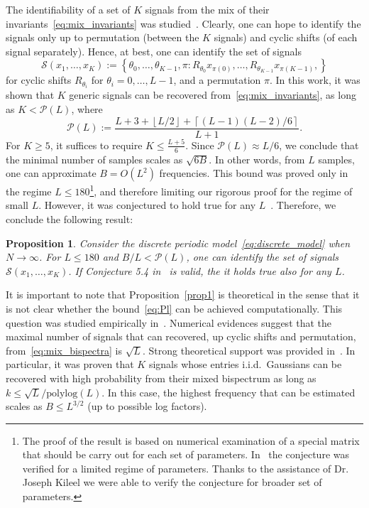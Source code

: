 \documentclass[english,12pt]{article}
\newcommand{\TODO}[1]{{\color{red}{[#1]}}}
\numberwithin{equation}{section}
\numberwithin{thm}{section} %
\newtheorem{prop}[thm]{Proposition}
\begin{document}
The identifiability of a set of $K$ signals from the mix of their  invariants~\eqref{eq:mix_invariants} was studied~\cite{bandeira2017estimation}.
Clearly, one can hope to identify the signals only up  to permutation (between the $K$ signals) and cyclic shifts (of each signal separately). 
Hence, at best, one can identify the set of signals  
\begin{equation}
\mathcal{S}(x_1,\ldots,x_K):=\left\{ \theta_0,\ldots,\theta_{K-1},\pi : R_{\theta_0}x_{\pi(0)}, \ldots,R_{\theta_{K-1}}x_{\pi(K-1)},
\right\}
\end{equation}
for cyclic shifts $R_{\theta_i}$ for $\theta_i=0,\ldots,L-1$, and a permutation $\pi$.
In this work, it was shown that $K$ generic signals can be recovered from~\eqref{eq:mix_invariants},  as long as $K<\mathcal{P}(L)$, where
\begin{equation} \label{eq:Pl}
\mathcal{P}(L) := \frac{L+3+\left\lfloor L/2\right\rfloor +  \left\lceil (L-1)(L-2)/6\right\rceil}{L+1}.
\end{equation}
For $K\geq 5$, it suffices to require $K\leq \frac{L+5}{6}$. 
Since $\mathcal{P}(L) \approx L/6$, we conclude that the minimal number of samples scales as $\sqrt{6B}$. In other words, from $L$ samples, one can approximate  $B=O(L^2)$ frequencies. 
This bound was proved only in the regime $L\leq 180$\footnote{The proof of the result is based on numerical examination of a special matrix that should be carry out for each set of parameters. In~\cite{bandeira2017estimation} the conjecture was verified for a limited regime of parameters. Thanks to the assistance of Dr. Joseph Kileel we were able to verify the conjecture for broader set of parameters.}, and therefore limiting our rigorous proof for the regime of small $L$. 
However, it was conjectured  to hold true for any $L$~\cite[Conjecture 5.4]{bandeira2017estimation}.
Therefore, we conclude the following result:
\begin{prop} \label{prop1}
Consider the  discrete periodic model~\eqref{eq:discrete_model} when $N\to\infty$. 
For $L\leq 180$ and  $B/L<\mathcal{P}(L)$, one can identify the set of signals $\mathcal{S}(x_1,\ldots,x_K)$.
If Conjecture 5.4 in~\cite{bandeira2017estimation} is valid, the it holds true also for any $L$.
\end{prop}	

It is important to note that Proposition~\eqref{prop1} is theoretical in the sense that it is not clear whether the bound~\eqref{eq:Pl} can be achieved computationally.  
This question was studied empirically in~\cite{boumal2018heterogeneous}. Numerical evidences suggest that the maximal number of signals that can recovered, up cyclic shifts and permutation, from~\eqref{eq:mix_bispectra} is $\sqrt{L}$. 
Strong theoretical support was provided in~\cite{weinthesis}. In particular,  it was proven that $K$ signals whose entries i.i.d.\ Gaussians can be recovered with high probability from their mixed bispectrum as long as $k\leq \sqrt{L}/\text{polylog}(L)$.
In this case, the highest frequency that can be estimated scales as $B\leq L^{3/2}$ (up to possible log factors). 
\TODO{This is true for signals with white spectrum... for our case the bound seems smaller since the signals are smooth}
\end{document}
